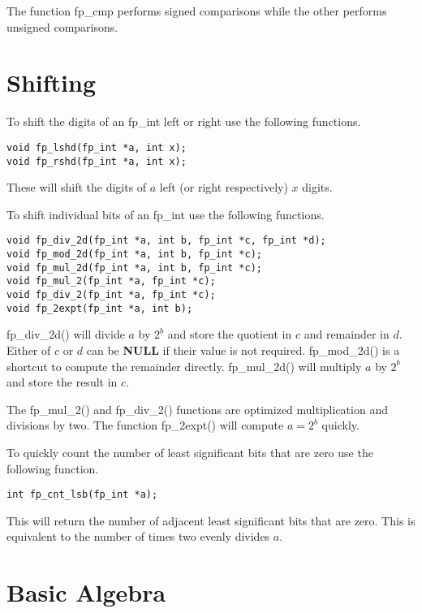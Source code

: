 \documentclass[b5paper]{book}
\begin{document}
The function fp\_cmp performs signed comparisons while the other performs unsigned comparisons.

\section{Shifting}
To shift the digits of an fp\_int left or right use the following functions.

 
\begin{verbatim}
void fp_lshd(fp_int *a, int x);
void fp_rshd(fp_int *a, int x);
\end{verbatim}

These will shift the digits of $a$ left (or right respectively) $x$ digits.  

To shift individual bits of an fp\_int use the following functions.

    
\begin{verbatim}
void fp_div_2d(fp_int *a, int b, fp_int *c, fp_int *d);
void fp_mod_2d(fp_int *a, int b, fp_int *c);
void fp_mul_2d(fp_int *a, int b, fp_int *c);
void fp_mul_2(fp_int *a, fp_int *c);
void fp_div_2(fp_int *a, fp_int *c);
void fp_2expt(fp_int *a, int b);
\end{verbatim}
fp\_div\_2d() will divide $a$ by $2^b$ and store the quotient in $c$ and remainder in $d$.  Either of 
$c$ or $d$ can be \textbf{NULL} if their value is not required.  fp\_mod\_2d() is a shortcut to 
compute the remainder directly.  fp\_mul\_2d() will multiply $a$ by $2^b$ and store the result in $c$.  

The fp\_mul\_2() and fp\_div\_2() functions are optimized multiplication and divisions by two.  The 
function fp\_2expt() will compute $a = 2^b$ quickly.

To quickly count the number of least significant bits that are zero use the following function.

\begin{verbatim}
int fp_cnt_lsb(fp_int *a);
\end{verbatim}
This will return the number of adjacent least significant bits that are zero.  This is equivalent 
to the number of times two evenly divides $a$.

\section{Basic Algebra}
\end{document}
